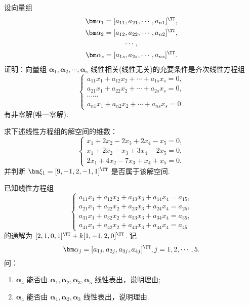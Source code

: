 	\begin{titwo}
		设向量组
		\begin{gather*}
			\bm \alpha_{1} = [a_{11},a_{21},\cdots,a_{n1}]^{\TT},\\
			\bm \alpha_{2} = [a_{12},a_{22},\cdots,a_{n2}]^{\TT},\\
			\cdots,\\
			\bm \alpha_{s} = [a_{1s},a_{2s},\cdots,a_{ns}]^{\TT}.
		\end{gather*}
		证明：向量组 $\bm \alpha_{1},\bm \alpha_{2},\cdots,\bm \alpha_{s}$ 线性相关(线性无关)的充要条件是齐次线性方程组
		\[
			\begin{cases}
				a_{11}x_{1} + a_{12}x_{2} + \cdots + a_{1s}x_{s} = 0,\\
				a_{21}x_{1} + a_{22}x_{2} + \cdots + a_{2s}x_{s} = 0,\\
				\cdots\cdots\\
				a_{n1}x_{1} + a_{n2}x_{2} + \cdots + a_{ns}x_{s} = 0
			\end{cases}
		\]
		有非零解(唯一零解).
	\end{titwo}

	\begin{titwo}
		求下述线性方程组的解空间的维数：
		\[
			\begin{cases}
				x_{1} + 2x_{2} - 2x_{3} + 2x_{4} - x_{5} = 0,\\
				x_{1} + 2x_{2} - x_{3} + 3x_{4} - 2x_{5} = 0,\\
				2x_{1} + 4x_{2} - 7x_{3} + x_{4} + x_{5} = 0.
			\end{cases}
		\]
		并判断 $\bm \xi_{1} = [9,-1,2,-1,1]^{\TT}$ 是否属于该解空间.
	\end{titwo}

	\begin{titwo}
		已知线性方程组
		\[
			\begin{cases}
				a_{11}x_{1} + a_{12}x_{2} + a_{13}x_{3} + a_{14}x_{4} = a_{15},\\
				a_{21}x_{1} + a_{22}x_{2} + a_{23}x_{3} + a_{24}x_{4} = a_{25},\\
				a_{31}x_{1} + a_{32}x_{2} + a_{33}x_{3} + a_{34}x_{4} = a_{35},\\
				a_{41}x_{1} + a_{42}x_{2} + a_{43}x_{3} + a_{44}x_{4} = a_{45}
			\end{cases}
		\]
		的通解为 $[2,1,0,1]^{\TT} + k [1,-1,2,0]^{\TT}$. 记
		\[
			\bm \alpha_{j} = [a_{1j},a_{2j},a_{3j},a_{4j}]^{\TT}, j = 1,2,\cdots,5.
		\]
		问：
		\begin{enumerate}
			\item $\bm \alpha_{4}$ 能否由 $\bm \alpha_{1},\bm \alpha_{2},\bm \alpha_{3},\bm \alpha_{5}$ 线性表出，说明理由;
			\item $\bm \alpha_{4}$ 能否由 $\bm \alpha_{1},\bm \alpha_{2},\bm \alpha_{3}$ 线性表出，说明理由.
		\end{enumerate}
	\end{titwo}

